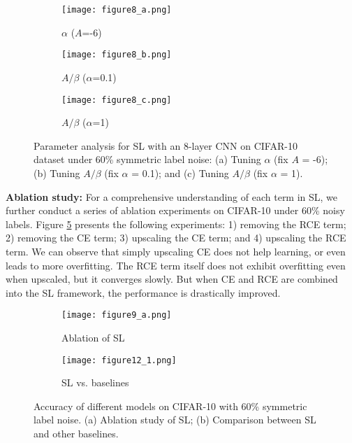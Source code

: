\documentclass[10pt,twocolumn,letterpaper]{article}
\begin{document}
\begin{figure}[!t]
	\centering
	\begin{subfigure}{0.32\linewidth}
		\texttt{[image: figure8\_a.png]}
		\caption{$\alpha$ ($A$=-6)}
		\label{sce_alpha}
	\end{subfigure}
	\begin{subfigure}{0.32\linewidth}
		\texttt{[image: figure8\_b.png]}
		\caption{$A/\beta$ ($\alpha$=0.1)}
		\label{sce_A1}
	\end{subfigure}
	\begin{subfigure}{0.32\linewidth}
		\texttt{[image: figure8\_c.png]}
		\caption{$A/\beta$ ($\alpha$=1)} 
		\label{sce_A2}
	\end{subfigure}
	\vspace{-0.1 in}
	\caption{Parameter analysis for SL with an 8-layer CNN on CIFAR-10 dataset under 60\% symmetric label noise: (a) Tuning $\alpha$ (fix $A$ = -6); (b) Tuning $A/\beta$ (fix $\alpha$ = 0.1); and (c) Tuning $A/\beta$ (fix $\alpha$ = 1).}
	\vspace{-0.1 in}
	\label{fig:param_analysis}
\end{figure}

\noindent\textbf{Ablation study:}
For a comprehensive understanding of each term in SL, we further conduct a series of ablation experiments on CIFAR-10 under 60\% noisy labels. Figure \ref{ablation_sce} presents the following experiments: 1) removing the RCE term; 2) removing the CE term; 3) upscaling the CE term; and 4) upscaling the RCE term. We can observe that simply upscaling CE does not help learning, or even leads to more overfitting. The RCE term itself does not exhibit overfitting even when upscaled, but it converges slowly. But when CE and RCE are combined into the SL framework, the performance is drastically improved. 

\begin{figure}[!t]
	\centering
	\begin{subfigure}{0.49\linewidth}
		\texttt{[image: figure9\_a.png]}
		\caption{Ablation of SL}
		\label{ablation_sce}
	\end{subfigure}
	\begin{subfigure}{0.49\linewidth} 
		\texttt{[image: figure12\_1.png]}
		\caption{SL vs. baselines} 
		\label{learning_curve}
	\end{subfigure}
	\vspace{-0.1 in}
	\caption{Accuracy of different models on CIFAR-10 with 60\% symmetric label noise. (a) Ablation study of SL; (b) Comparison between SL and other baselines.}
	\vspace{-0.15 in}
	\label{fig:ce_sce_rep_40_asym}
\end{figure}
\end{document}
